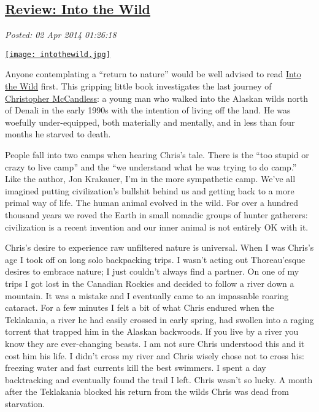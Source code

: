 %

\subsection*{\href{https://bakerjd99.wordpress.com/2014/04/01/review-into-the-wild/}{Review: Into the Wild}}


\noindent\emph{Posted: 02 Apr 2014 01:26:18}
\vspace{6pt}


\captionsetup[floatingfigure]{labelformat=empty}
\begin{floatingfigure}[l]{0.25\textwidth}
\centering
\href{http://www.goodreads.com/book/show/1845.Into\_the\_Wild}{\texttt{[image: intothewild.jpg]}}
\label{fig:4604X0}
\end{floatingfigure} Anyone
contemplating a ``return to nature'' would be well advised to read
\href{http://www.amazon.com/Into-Wild-Jon-Krakauer/dp/0385486804}{Into
the Wild} first. This gripping little book investigates the last journey
of
\href{http://en.wikipedia.org/wiki/Christopher\_McCandless}{Christopher
McCandless}: a young man who walked into the Alaskan wilds north of
Denali in the early 1990s with the intention of living off the land. He
was woefully under-equipped, both materially and mentally, and in less
than four months he starved to death.

People fall into two camps when hearing Chris's tale. There is the ``too
stupid or crazy to live camp'' and the ``we understand what he was
trying to do camp.'' Like the author, Jon Krakauer, I'm in the more
sympathetic camp. We've all imagined putting civilization's bullshit
behind us and getting back to a more primal way of life. The human
animal evolved in the wild. For over a hundred thousand years we roved
the Earth in small nomadic groups of hunter gatherers: civilization is a
recent invention and our inner animal is not entirely OK with it.

Chris's desire to experience raw unfiltered nature is universal. When I
was Chris's age I took off on long solo backpacking trips. I wasn't
acting out Thoreau'esque desires to embrace nature; I just couldn't
always find a partner. On one of my trips I got lost in the Canadian
Rockies and decided to follow a river down a mountain. It was a mistake
and I eventually came to an impassable roaring cataract. For a few
minutes I felt a bit of what Chris endured when the Teklakania, a river
he had easily crossed in early spring, had swollen into a raging torrent
that trapped him in the Alaskan backwoods. If you live by a river you
know they are ever-changing beasts. I am not sure Chris understood this
and it cost him his life. I didn't cross my river and Chris wisely chose
not to cross his: freezing water and fast currents kill the best
swimmers. I spent a day backtracking and eventually found the trail I
left. Chris wasn't so lucky. A month after the Teklakania blocked his
return from the wilds Chris was dead from starvation.

